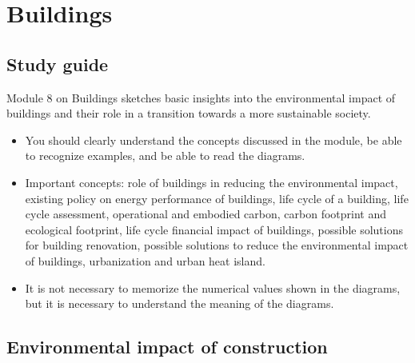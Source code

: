 \documentclass[../summary.tex]{subfiles}
\begin{document}
	
	\section{Buildings}
	
	\subsection{Study guide}
	
	Module 8 on Buildings sketches basic insights into the environmental impact of buildings and their role in a transition towards a more sustainable society. 
	
	\begin{itemize}
		\item You should clearly understand the concepts discussed in the module, be able to recognize examples, and be able to read the diagrams.
		\item Important concepts: role of buildings in reducing the environmental impact, existing policy on energy performance of buildings, life cycle of a building, life cycle assessment, operational and embodied carbon, carbon footprint and ecological footprint, life cycle financial impact of buildings, possible solutions for building renovation, possible solutions to reduce the environmental impact of buildings, urbanization and urban heat island.
		\item It is not necessary to memorize the numerical values shown in the diagrams, but it is necessary to understand the meaning of the diagrams.
	\end{itemize}
	
	\subsection{Environmental impact of construction}
	
	
\end{document}

